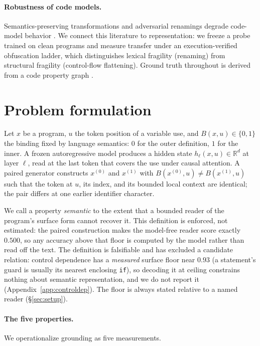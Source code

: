 \documentclass[10pt]{article}
\newcommand{\hb}{h_{\ell}}
\newcommand{\Real}{\mathbb{R}}
\newcommand{\Bind}{B}
\newcommand{\code}[1]{\texttt{#1}}
\begin{document}
\paragraph{Robustness of code models.} Semantics-preserving transformations and
adversarial renamings degrade code-model behavior
\citep{yefet2020adversarial,bielik2020robust,henkel2022semantic,rabin2021generalizability}.
We connect this literature to representation: we freeze a probe trained on clean
programs and measure transfer under an execution-verified obfuscation ladder,
which distinguishes lexical fragility (renaming) from structural fragility
(control-flow flattening). Ground truth throughout is derived from a code property
graph \citep{yamaguchi2014cpg}.

\section{Problem formulation}
\label{sec:formulation}
Let $x$ be a program, $u$ the token position of a variable use, and
$\Bind(x,u)\in\{0,1\}$ the binding fixed by language semantics: $0$ for the outer
definition, $1$ for the inner. A frozen autoregressive model produces a hidden
state $\hb(x,u)\in\Real^{d}$ at layer $\ell$, read at the last token that covers
the use under causal attention. A paired generator constructs $x^{(0)}$ and
$x^{(1)}$ with $\Bind(x^{(0)},u)\neq \Bind(x^{(1)},u)$ such that the token at $u$,
its index, and its bounded local context are identical; the pair differs at one
earlier identifier character.

We call a property \emph{semantic} to the extent that a bounded reader of the
program's surface form cannot recover it. This definition is enforced, not
estimated: the paired construction makes the model-free reader score exactly
$0.500$, so any accuracy above that floor is computed by the model rather than
read off the text. The definition is falsifiable and has excluded a candidate
relation: control dependence has a \emph{measured} surface floor near $0.93$ (a
statement's guard is usually its nearest enclosing \code{if}), so decoding it at
ceiling constrains nothing about semantic representation, and we do not report it
(Appendix~\ref{app:controldep}). The floor is always stated relative to a named
reader (\S\ref{sec:setup}).

\paragraph{The five properties.} We operationalize grounding as five measurements.
\end{document}
